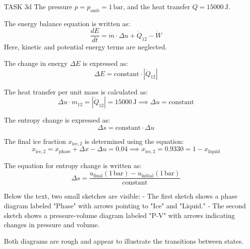 TASK 3d  
The pressure \( p = p_{\text{amb}} = 1 \, \text{bar} \), and the heat transfer \( Q = 15000 \, \text{J} \).  

The energy balance equation is written as:  
\[
\frac{dE}{dt} = \dot{m} \cdot \Delta u + \dot{Q}_{12} - \dot{W}
\]  
Here, kinetic and potential energy terms are neglected.  

The change in energy \( \Delta E \) is expressed as:  
\[
\Delta E = \text{constant} \cdot |\dot{Q}_{12}|
\]  

The heat transfer per unit mass is calculated as:  
\[
\Delta u \cdot m_{12} = |\dot{Q}_{12}| = 15000 \, \text{J} \implies \Delta u = \text{constant}
\]  

The entropy change is expressed as:  
\[
\Delta s = \text{constant} \cdot \Delta u
\]  

The final ice fraction \( x_{\text{ice},2} \) is determined using the equation:  
\[
x_{\text{ice},2} = x_{\text{phase}} + \Delta x - \Delta u = 0.04 \implies x_{\text{ice},2} = 0.9330 = 1 - x_{\text{liquid}}
\]  

The equation for entropy change is written as:  
\[
\Delta s = \frac{u_{\text{final}}(1 \, \text{bar}) - u_{\text{initial}}(1 \, \text{bar})}{\text{constant}}
\]  

Below the text, two small sketches are visible:  
- The first sketch shows a phase diagram labeled "Phase" with arrows pointing to "Ice" and "Liquid."  
- The second sketch shows a pressure-volume diagram labeled "P-V" with arrows indicating changes in pressure and volume.  

Both diagrams are rough and appear to illustrate the transitions between states.
